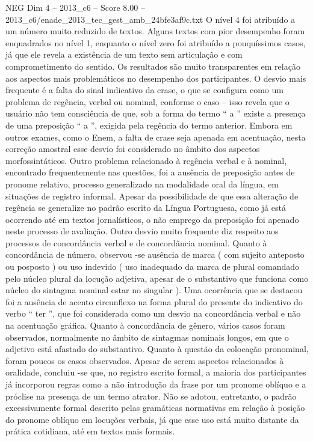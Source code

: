 \begin{textsample}{NEG Dim 4 – 2013\_c6 – Score 8.00 – 2013\_c6/enade\_2013\_tec\_gest\_amb\_24bfe3af9c.txt}
O nível 4 foi atribuído a um número muito reduzido de textos.
Alguns textos com pior desempenho foram enquadrados no nível 1, enquanto o nível zero foi atribuído a pouquíssimos casos, já que ele revela a existência de um texto sem articulação e com comprometimento do sentido.
Os resultados são muito transparentes em relação aos aspectos mais problemáticos no desempenho dos participantes.
O desvio mais frequente é a falta do sinal indicativo da crase, o que se configura como um problema de regência, verbal ou nominal, conforme o caso – isso revela que o usuário não tem consciência de que, sob a forma do termo “ a ” existe a presença de uma preposição “ a ”, exigida pela regência do termo anterior.
Embora em outros exames, como o Enem, a falta de crase seja apenada em acentuação, nesta correção amostral esse desvio foi considerado no âmbito dos aspectos morfossintáticos.
Outro problema relacionado à regência verbal e à nominal, encontrado frequentemente nas questões, foi a ausência de preposição antes de pronome relativo, processo generalizado na modalidade oral da língua, em situações de registro informal.
Apesar da possibilidade de que essa alteração de regência se generalize no padrão escrito da Língua Portuguesa, como já está ocorrendo até em textos jornalísticos, o não emprego da preposição foi apenado neste processo de avaliação.
Outro desvio muito frequente diz respeito aos processos de concordância verbal e de concordância nominal.
Quanto à concordância de número, observou -se ausência de marca ( com sujeito anteposto ou posposto ) ou uso indevido ( uso inadequado da marca de plural comandado pelo núcleo plural da locução adjetiva, apesar de o substantivo que funciona como núcleo do sintagma nominal estar no singular ).
Uma ocorrência que se destacou foi a ausência de acento circunflexo na forma plural do presente do indicativo do verbo “ ter ”, que foi considerada como um desvio na concordância verbal e não na acentuação gráfica.
Quanto à concordância de gênero, vários casos foram observados, normalmente no âmbito de sintagmas nominais longos, em que o adjetivo está afastado do substantivo.
Quanto à questão da colocação pronominal, foram poucos os casos observados.
Apesar de serem aspectos relacionados à oralidade, concluiu -se que, no registro escrito formal, a maioria dos participantes já incorporou regras como a não introdução da frase por um pronome oblíquo e a próclise na presença de um termo atrator.
Não se adotou, entretanto, o padrão excessivamente formal descrito pelas gramáticas normativas em relação à posição do pronome oblíquo em locuções verbais, já que esse uso está muito distante da prática cotidiana, até em textos mais formais.

\end{textsample}

